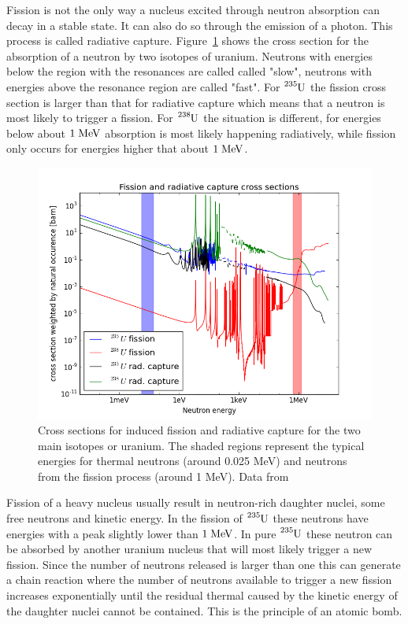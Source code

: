 \documentclass[12pt]{article}
\begin{document}
Fission is not the only way a nucleus excited through neutron absorption can decay in a stable state. It can also do so through the emission of a photon. This process is called radiative capture. Figure~\ref{fig:neutronCrossSection} shows the cross section for the absorption of a neutron by two isotopes of uranium. Neutrons with energies below the region with the resonances are called called "slow", neutrons with energies above the resonance region are called "fast". For $\ce{^{235}U}$ the fission cross section is larger than that for radiative capture which means that a neutron is most likely to trigger a fission. For $\ce{^{238}U}$ the situation is different, for energies below about $1\;\rm{MeV}$ absorption is most likely happening radiatively, while fission only occurs for energies higher that about $1\;\rm{MeV}$.

\begin{figure}
\begin{center}
\includegraphics[scale=0.5]{images/neutronCrossSection.png}   
\end{center}
\caption{Cross sections for induced fission and radiative capture for the two main isotopes or uranium. The shaded regions represent the typical energies for thermal neutrons (around 0.025 MeV) and neutrons from the fission process (around 1 MeV). Data from \cite{nds}}\label{fig:neutronCrossSection}
\end{figure} 
Fission of a heavy nucleus usually result in neutron-rich daughter nuclei, some free neutrons and kinetic energy. In the fission of $\ce{^{235}U}$ these neutrons have energies with a peak slightly lower than $1\;\rm{MeV}$. In pure $\ce{^{235}U}$ these neutron can be absorbed by another uranium nucleus that will most likely trigger a new fission. Since the number of neutrons released is larger than one this can generate a chain reaction where the number of neutrons available to trigger a new fission increases exponentially until the residual thermal caused by the kinetic energy of the daughter nuclei cannot be contained. This is the principle of an atomic bomb. 
\end{document}
